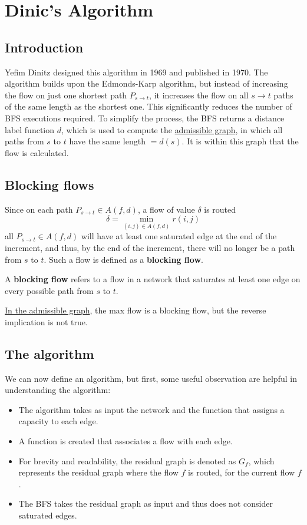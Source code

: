 
\chapter{Dinic's Algorithm} \label{chap:dnc}
\section{Introduction}
Yefim Dinitz designed this algorithm in 1969 and published\cite{Dinitz2006} in 1970. 
The algorithm builds upon the Edmonds-Karp algorithm, but instead of increasing the flow on just one shortest path $P_{s\rightarrow t}$, it increases the flow on all $s\rightarrow t$ paths of the same length as the shortest one.
This significantly reduces the number of BFS executions required.
To simplify the process, the BFS returns a distance label function $d$, which is used to compute the \hyperref[AdmissibleGraph]{admissible graph}, in which all paths from $s$ to $t$ have the same length $=d(s)$. It is within this graph that the flow is calculated.
\section{Blocking flows}
Since on each path $P_{s\rightarrow t} \in A(f,d)$, a flow of value $\delta$ is routed
\[\delta = \min_{(i,j)\in A(f,d)} r(i,j)\]
all $P_{s\rightarrow t} \in A(f,d)$ will have at least one saturated edge at the end of the increment, and thus, by the end of the increment, there will no longer be a path from $s$ to $t$.
Such a flow is defined as a \textbf{blocking flow}.
\begin{definition}
    A \textbf{blocking flow} refers to a flow in a network that saturates at least one edge on every possible path from $s$ to $t$.  
\end{definition}

\begin{obs}
    \underline{In the admissible graph}, the max flow is a blocking flow, but the reverse implication is not true.
\end{obs}
\section{The algorithm}
We can now define an algorithm, but first, some useful observation are helpful in understanding the algorithm:
\begin{itemize}
    \item The algorithm takes as input the network and the function that assigns a capacity to each edge.
    \item A function is created that associates a flow with each edge.
    \item For brevity and readability, the residual graph is denoted as \( G_f \), which represents the residual graph where the flow \( f \) is routed, for the current flow $f$.
    \item The BFS takes the residual graph as input and thus does not consider saturated edges.
\end{itemize}


